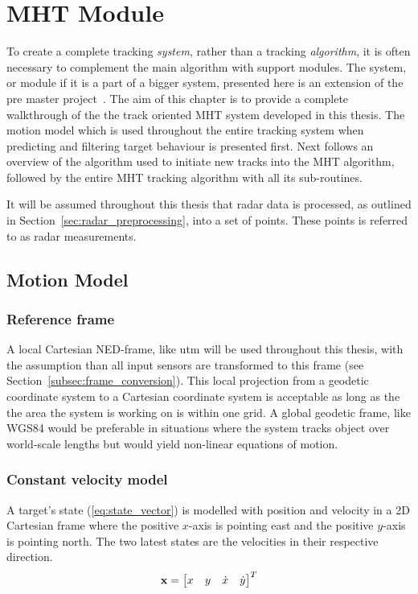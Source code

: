 
\chapter{MHT Module}\label{chapter:mht-module}
To create a complete tracking \emph{system}, rather than a tracking \emph{\gls{algorithm}}, it is often necessary to complement the main algorithm with support modules. The system, or module if it is a part of a bigger system, presented here is an extension of the pre master project~\cite{Liland_2017}. The aim of this chapter is to provide a complete walkthrough of the the track oriented MHT system developed in this thesis. The motion model which is used throughout the entire tracking system when predicting and filtering target behaviour is presented first. Next follows an overview of the algorithm used to initiate new tracks into the MHT algorithm, followed by the entire MHT tracking algorithm with all its sub-routines.

It will be assumed throughout this thesis that radar data is processed, as outlined in Section~\ref{sec:radar_preprocessing}, into a set of points. These points is referred to as radar measurements.

\section{Motion Model}\label{sec:motion-model}
\subsection{Reference frame}
A local Cartesian NED-frame, like \gls{utm} will be used throughout this thesis, with the assumption than all input sensors are transformed to this frame (see Section~\ref{subsec:frame_conversion}). This local projection from a geodetic coordinate system to a Cartesian coordinate system is acceptable as long as the the area the system is working on is within one grid. A global geodetic frame, like WGS84 would be preferable in situations where the system tracks object over world-scale lengths but would yield non-linear equations of motion.

\subsection{Constant velocity model}
A target's state (\ref{eq:state_vector}) is modelled with position and velocity in a 2D Cartesian frame where the positive \(x\)-axis is pointing east and the positive \(y\)-axis is pointing north. The two latest states are the velocities in their respective direction.
\begin{equation}
\boldsymbol{\mathbf{x}} = \begin{bmatrix}
x & y & \dot{x} & \dot{y}
\end{bmatrix}^T
\label{eq:state_vector}
\end{equation}

